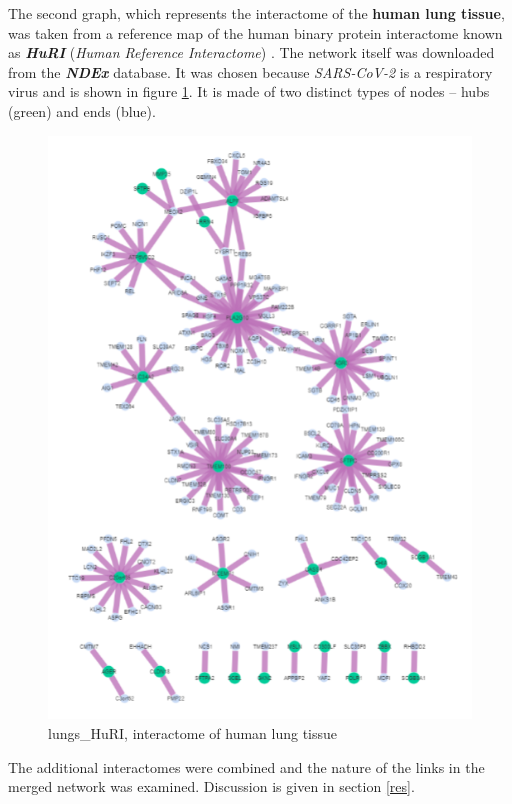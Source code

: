 \documentclass[a4paper]{article}
\begin{document}
The second graph, which represents the interactome of the \textbf{human lung tissue}, was taken from a reference map of the human binary protein interactome known as \textbf{\textit{HuRI}} (\textit{Human Reference Interactome}) \cite{luck}. The network itself was downloaded from the \textbf{\textit{NDEx}}\footnotemark {} database. It was chosen because \textit{SARS-CoV-2} is a respiratory virus and is shown in figure \ref{lungs}. It is made of two distinct types of nodes -- hubs (green) and ends (blue).

\begin{figure}[h!]
  \centering
  \includegraphics[scale=0.65]{pluca_HuRI.png}
  \caption{lungs\_HuRI, interactome of human lung tissue}
  \label{lungs}
\end{figure}

The additional interactomes were combined and the nature of the links in the merged network was examined. Discussion is given in section \ref{res}.
\end{document}
